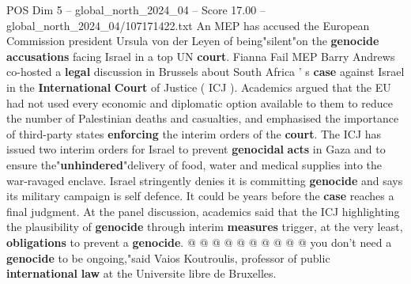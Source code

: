 \begin{textsample}{POS Dim 5 – global\_north\_2024\_04 – Score 17.00 – global\_north\_2024\_04/107171422.txt}  \label{ex:f5_pos_267}
An MEP has accused the European Commission president Ursula von der Leyen of being"silent"on the \textbf{genocide} \textbf{accusations} facing Israel in a top UN \textbf{court}.
Fianna Fail MEP Barry Andrews co-hosted a \textbf{legal} discussion in Brussels about South Africa ' s \textbf{case} against Israel in the \textbf{International} \textbf{Court} of Justice ( ICJ ).
Academics argued that the EU had not used every economic and diplomatic option available to them to reduce the number of Palestinian deaths and casualties, and emphasised the importance of third-party states \textbf{enforcing} the interim orders of the \textbf{court}.
The ICJ has issued two interim orders for Israel to prevent \textbf{genocidal} \textbf{acts} in Gaza and to ensure the"\textbf{unhindered}"delivery of food, water and medical supplies into the war-ravaged enclave.
Israel stringently denies it is committing \textbf{genocide} and says its military campaign is self defence.
It could be years before the \textbf{case} reaches a final judgment.
At the panel discussion, academics said that the ICJ highlighting the plausibility of \textbf{genocide} through interim \textbf{measures} trigger, at the very least, \textbf{obligations} to prevent a \textbf{genocide}. @ @ @ @ @ @ @ @ @ @ you don't need a \textbf{genocide} to be ongoing,"said Vaios Koutroulis, professor of public \textbf{international} \textbf{law} at the Universite libre de Bruxelles.

\end{textsample}
